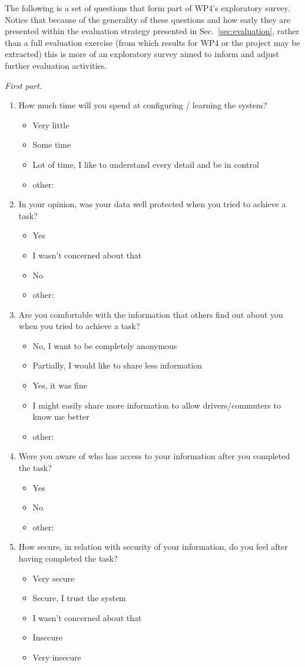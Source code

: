 The following is a set of questions that form part of WP4's exploratory survey. Notice that because of the generality of these questions and how early they are presented within the evaluation strategy presented in Sec.~\ref{sec:evaluation}, rather than a full evaluation exercise (from which results for WP4 or the project may be extracted) this is more of an exploratory survey aimed to inform and adjust further evaluation activities.

\emph{First part.}

\begin{enumerate}
\item How much time will you spend at configuring / learning the system? 
	\begin{itemize}
	\item Very little
	\item Some time
	\item Lot of time, I like to understand every detail and be in control
	\item other: 
	\end{itemize}
\item In your opinion, was your data well protected when you tried to achieve a task? 
	\begin{itemize}
	\item Yes
	\item I wasn't concerned about that
	\item No
	\item other:
	\end{itemize}
\item Are you comfortable with the information that others find out about you when you tried to achieve a task? 
	\begin{itemize}
	\item No, I want to be completely anonymous
	\item Partially, I would like to share less information
	\item Yes, it was fine
	\item I might easily share more information to allow drivers/commuters to know me better
	\item other:
	\end{itemize}
\item Were you aware of who has access to your information after you completed the task?
	\begin{itemize}
	\item Yes
	\item No
	\item other:
	\end{itemize}
\item How secure, in relation with security of your information, do you feel after having completed the task? 
	\begin{itemize}
	\item Very secure
	\item Secure, I trust the system
	\item I wasn't concerned about that
	\item Insecure
	\item Very insecure 
	\end{itemize}
\end{enumerate}
	

